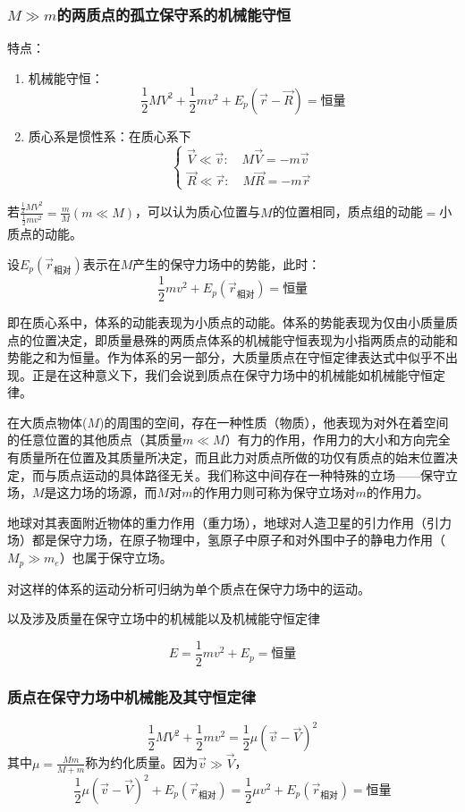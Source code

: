 \subsubsection{$M\gg m$的两质点的孤立保守系的机械能守恒}
特点：
\begin{enumerate}
\item 机械能守恒：\[\frac{1}{2}MV^2+\frac{1}{2}mv^2+E_p(\vec{r}-\vec{R})=\text{恒量}\]
\item 质心系是惯性系：在质心系下
\[\begin{cases}
\vec{V}\ll\vec{v}:\quad M\vec{V}=-m\vec{v} \\
\vec{R}\ll \vec{r}:\quad M\vec{R}=-m\vec{r}
\end{cases}\]
\end{enumerate}
若$\frac{\frac{1}{2}MV^2}{\frac{1}{2}mv^2}=\frac{m}{M}(m\ll M)$，可以认为质心位置与$M$的位置相同，质点组的动能$=$小质点的动能。

设$E_p(\vec{r}_\text{相对})$表示在$M$产生的保守力场中的势能，此时：
\[\frac{1}{2}mv^2+E_p(\vec{r}_\text{相对})=\text{恒量}\]

即在质心系中，体系的动能表现为小质点的动能。体系的势能表现为仅由小质量质点的位置决定，即质量悬殊的两质点体系的机械能守恒表现为小指两质点的动能和势能之和为恒量。作为体系的另一部分，大质量质点在守恒定律表达式中似乎不出现。正是在这种意义下，我们会说到质点在保守力场中的机械能如机械能守恒定律。

在大质点物体($M$)的周围的空间，存在一种性质（物质），他表现为对外在着空间的任意位置的其他质点（其质量$m\ll M$）有力的作用，作用力的大小和方向完全有质量所在位置及其质量所决定，而且此力对质点所做的功仅有质点的始末位置决定，而与质点运动的具体路径无关。我们称这中间存在一种特殊的立场——保守立场，$M$是这力场的场源，而$M$对$m$的作用力则可称为保守立场对$m$的作用力。

地球对其表面附近物体的重力作用（重力场），地球对人造卫星的引力作用（引力场）都是保守力场，在原子物理中，氢原子中原子和对外围中子的静电力作用（$M_p\gg m_e$）也属于保守立场。

对这样的体系的运动分析可归纳为单个质点在保守力场中的运动。

以及涉及质量在保守立场中的机械能以及机械能守恒定律

\[E=\frac{1}{2}mv^2+E_p=\text{恒量}\]

\subsubsection{质点在保守力场中机械能及其守恒定律}
\[\frac{1}{2}MV^2+\frac{1}{2}mv^2=\frac{1}{2}\mu(\vec{v}-\vec{V})^2\]
其中$\mu=\frac{Mm}{M+m}$称为约化质量。因为$\vec{v}\gg \vec{V}$，
\[\frac{1}{2}\mu (\vec{v}-\vec{V})^2+E_p(\vec{r}_\text{相对})=\frac{1}{2}\mu v^2+E_p(\vec{r}_\text{相对})=\text{恒量}\]

